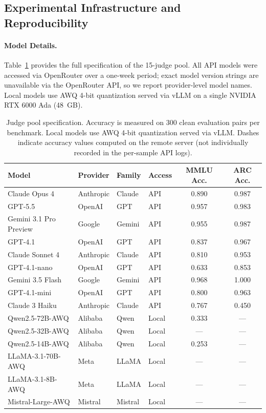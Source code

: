 \subsection{Experimental Infrastructure and Reproducibility}
\label{app:infrastructure}

\paragraph{Model Details.} Table~\ref{tab:model_details} provides the full specification of the 15-judge pool. All API models were accessed via OpenRouter over a one-week period; exact model version strings are unavailable via the OpenRouter API, so we report provider-level model names. Local models use AWQ 4-bit quantization \citep{lin2024awq} served via vLLM \citep{kwon2023efficient} on a single NVIDIA RTX 6000 Ada (48~GB).

\begin{table}[t]
\centering
\footnotesize
\setlength{\tabcolsep}{3pt}
\caption{Judge pool specification. Accuracy is measured on 300 clean evaluation pairs per benchmark. Local models use AWQ 4-bit quantization served via vLLM. Dashes indicate accuracy values computed on the remote server (not individually recorded in the per-sample API logs).}
\label{tab:model_details}
\begin{tabular}{llllcc}
\toprule
\textbf{Model} & \textbf{Provider} & \textbf{Family} & \textbf{Access} & \textbf{MMLU Acc.} & \textbf{ARC Acc.} \\
\midrule
Claude Opus 4 & Anthropic & Claude & API & 0.890 & 0.987 \\
GPT-5.5 & OpenAI & GPT & API & 0.957 & 0.983 \\
Gemini 3.1 Pro Preview & Google & Gemini & API & 0.955 & 0.987 \\
GPT-4.1 & OpenAI & GPT & API & 0.837 & 0.967 \\
Claude Sonnet 4 & Anthropic & Claude & API & 0.810 & 0.953 \\
GPT-4.1-nano & OpenAI & GPT & API & 0.633 & 0.853 \\
Gemini 3.5 Flash & Google & Gemini & API & 0.968 & 1.000 \\
GPT-4.1-mini & OpenAI & GPT & API & 0.800 & 0.963 \\
Claude 3 Haiku & Anthropic & Claude & API & 0.767 & 0.450 \\
\addlinespace
Qwen2.5-72B-AWQ & Alibaba & Qwen & Local & 0.333 & --- \\
Qwen2.5-32B-AWQ & Alibaba & Qwen & Local & --- & --- \\
Qwen2.5-14B-AWQ & Alibaba & Qwen & Local & 0.253 & --- \\
LLaMA-3.1-70B-AWQ & Meta & LLaMA & Local & --- & --- \\
LLaMA-3.1-8B-AWQ & Meta & LLaMA & Local & --- & --- \\
Mistral-Large-AWQ & Mistral & Mistral & Local & --- & --- \\
\bottomrule
\end{tabular}
\end{table}

